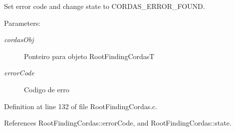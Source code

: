 Set error code and change state to CORDAS\_\-ERROR\_\-FOUND. 

\begin{Desc}
\item[Parameters:]
\begin{description}
\item[{\em cordasObj}]Ponteiro para objeto RootFindingCordasT \item[{\em errorCode}]Codigo de erro \end{description}
\end{Desc}


Definition at line 132 of file RootFindingCordas.c.

References RootFindingCordas::errorCode, and RootFindingCordas::state.